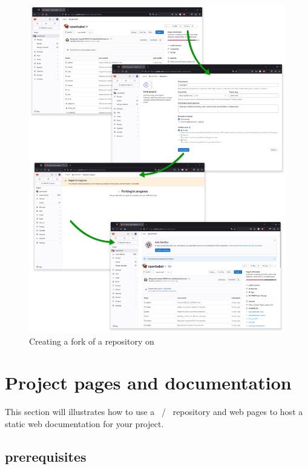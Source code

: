 \begin{figure}[!p]
\includegraphics[width=1.0\textwidth,keepaspectratio=true,draft=\ddst]{img/hosts/gitlab/fork.eps} 
\caption{Creating a fork of a repository on \gitlab\label{fgitlab}}
\end{figure}

\newpage
\section{Project pages and documentation}

This section will illustrates how to use a \github\ / \gitlab\ repository and web pages to host a static web documentation for your project. 

\subsection{prerequisites}

